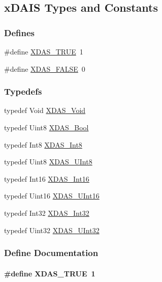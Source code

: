 \hypertarget{group__ti__xdais___x_d_a_s}{
\subsection{x\-DAIS Types and Constants}
\label{group__ti__xdais___x_d_a_s}
}


\subsubsection*{Defines}
\begin{CompactItemize}
\item 
\#define \hyperlink{group__ti__xdais___x_d_a_s_g0a1e9fe6b661ca6eafe982fe2b0787bc}{XDAS\_\-TRUE}~1
\item 
\#define \hyperlink{group__ti__xdais___x_d_a_s_g5cd894ca3ba5c100f7f863dae8587293}{XDAS\_\-FALSE}~0
\end{CompactItemize}
\subsubsection*{Typedefs}
\begin{CompactItemize}
\item 
typedef Void \hyperlink{group__ti__xdais___x_d_a_s_g125aad4180e7ca9a3ddaba59c9217513}{XDAS\_\-Void}
\item 
typedef Uint8 \hyperlink{group__ti__xdais___x_d_a_s_gc8ce48f3d618a6f0a37b4e55f978b825}{XDAS\_\-Bool}
\item 
typedef Int8 \hyperlink{group__ti__xdais___x_d_a_s_ga0b0c4cc1bf0d8fa0d9b15de0e9204cc}{XDAS\_\-Int8}
\item 
typedef Uint8 \hyperlink{group__ti__xdais___x_d_a_s_gc9308edb855a360c27a47aaa6f3b39a9}{XDAS\_\-UInt8}
\item 
typedef Int16 \hyperlink{group__ti__xdais___x_d_a_s_g8189aa7a8636f505d6a35e5744ac6392}{XDAS\_\-Int16}
\item 
typedef Uint16 \hyperlink{group__ti__xdais___x_d_a_s_ga27605972947c862397ebee40c2ff917}{XDAS\_\-UInt16}
\item 
typedef Int32 \hyperlink{group__ti__xdais___x_d_a_s_ge431579ed9eff9134de78ca00ddd5f3e}{XDAS\_\-Int32}
\item 
typedef Uint32 \hyperlink{group__ti__xdais___x_d_a_s_g615572fcd2279a6780dc1785d72ff421}{XDAS\_\-UInt32}
\end{CompactItemize}


\subsubsection{Define Documentation}
\hypertarget{group__ti__xdais___x_d_a_s_g0a1e9fe6b661ca6eafe982fe2b0787bc}{
\paragraph[XDAS\_\-TRUE]{\setlength{\rightskip}{0pt plus 5cm}\#define XDAS\_\-TRUE~1}\hfill}
\label{group__ti__xdais___x_d_a_s_g0a1e9fe6b661ca6eafe982fe2b0787bc}




